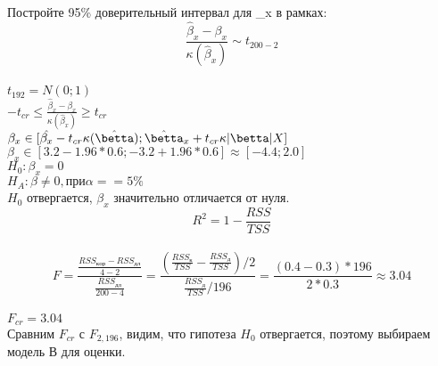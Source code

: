 \documentclass[12pt]{article} %
\theoremstyle{definition} %
\begin{document}
Постройте 95\% доверительный интервал для \beta_x в рамках:\\
$$\frac{\hat{\beta}_x - {\beta}_x}{\kappa(\hat{\beta}_x)} \sim t_{200-2} $$ \\
$t_192 = N(0;1)$\\
$-t_{cr} \leq \frac{\hat{\beta}_x - {\beta}_x}{\kappa(\hat{\beta}_x)} \geq t_{cr} $\\
$\beta_x \in [\hat{\beta_x} - t_{cr}\kappa(\hat{\betta});\hat{\betta}_x + t_{cr}\kappa|\betta|X]$\\
$\beta_x \in [3.2 - 1.96*0.6; -3.2 + 1.96*0.6] \approx [-4.4;2.0]$\\
$H_0:\beta_x=0$\\
$H_A:\beta \neq 0, при \alpha==5\%$\\
$H_0$ отвергается, $\beta_x$ значительно отличается от нуля.\\

$$R^2=1-\frac{RSS}{TSS}$$\\

$$F=\frac{\frac{RSS_{кор}-RSS_{дл}}{4-2}}{\frac{RSS_{дл}}{200-4}}=\frac{(\frac{RSS_к}{TSS}-\frac{RSS_д}{TSS})/2}{\frac{RSS_д}{TSS}/196}=
\frac{(0.4-0.3)*196}{2*0.3} \approx 3.04$$\\
$F_{cr} = 3.04$\\
Сравним $F_{cr}$ с $F_{2,196}$, видим, что гипотеза $H_0$ отвергается, поэтому выбираем модель В для оценки.  



                    
                
                
\end{document}
